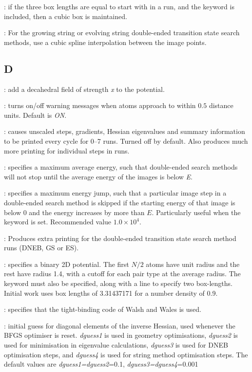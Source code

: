 {{: if the three box lengths are equal to start with in a {} run,
and the keyword { \/} is included, then a cubic box is maintained. 

: For the growing string or evolving string double-ended
  transition state search methods, use a cubic spline interpolation between
  the image points.




\subsection{D}
: add a decahedral field of strength {\it x} to the potential.

: turns on/off warning messages when atoms
approach to within $0.5$ distance units. Default is {\it ON\/}.

: causes unscaled steps, gradients, Hessian eigenvalues and
summary information to be printed every cycle for  0--7 runs. Turned off by default.
Also produces much more printing for individual steps in  runs.

: specifies a maximum average energy, such that
  double-ended search methods will not stop until the average energy of the
  images is below {\it E\/}. 

: specifies a maximum energy jump, such that a
  particular image step in a double-ended search method is skipped if the
  starting energy of that image is below $0$ and the energy increases by more
  than $E$. Particularly useful when the {} keyword is
  set. Recommended value $1.0\times10^4$.

: Produces extra printing for the double-ended
  transition state search method runs (DNEB, GS or ES).

: specifies a binary 2D potential.
The first $N/2$ atoms have unit radius and the rest 
have radius 1.4, with a cutoff for each pair type at the
average radius.
The keyword {} must also be specified, along with a 
{} line to specify two box-lengths.
Initial work uses box lengths of 3.31437171 for a number density of 0.9.

: specifies that the tight-binding code of Walsh and Wales\cite{WalshW98}
      is used.

: initial guess for diagonal elements of the inverse
      Hessian, used whenever the BFGS optimiser is reset. {\it dguess1\/} is used in
      geometry optimisations, {\it dguess2\/} is used for minimisation in
      eigenvalue calculations, {\it dguess3\/} is used for DNEB optimisation
      steps, and {\it dguess4\/} is used for string method optimisation steps.
      The default values are {\it dguess1=dguess2}=0.1, {\it dguess3=dguess4}=0.001

}}
